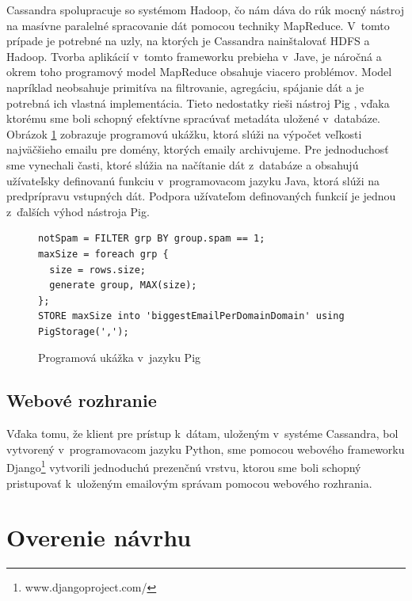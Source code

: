 \documentclass[11pt,twoside,a4paper]{book}
\begin{document}
Cassandra spolupracuje so systémom Hadoop, čo nám dáva do rúk mocný nástroj na masívne paralelné spracovanie dát pomocou techniky MapReduce. V~tomto prípade je potrebné na uzly, na ktorých je Cassandra nainštalovať HDFS a Hadoop. Tvorba aplikácií v~tomto frameworku prebieha v~Jave, je náročná a okrem toho programový model MapReduce obsahuje viacero problémov. Model napríklad neobsahuje primitíva na filtrovanie, agregáciu, spájanie dát a je potrebná ich vlastná implementácia. Tieto nedostatky rieši nástroj Pig \cite{olston2008pig}, vďaka ktorému sme boli schopný efektívne spracúvať metadáta uložené v~databáze. Obrázok \ref{fig:PigExample} zobrazuje programovú ukážku, ktorá slúži na výpočet veľkosti najväčšieho emailu pre domény, ktorých emaily archivujeme. Pre jednoduchosť sme vynechali časti, ktoré slúžia na načítanie dát z~databáze a obsahujú užívateľsky definovanú funkciu v~programovacom jazyku Java, ktorá slúži na predprípravu vstupných dát. Podpora užívateľom definovaných funkcií je jednou z~ďalších výhod nástroja Pig.

\begin{figure}[h]
\begin{verbatim}
notSpam = FILTER grp BY group.spam == 1;
maxSize = foreach grp {
  size = rows.size;
  generate group, MAX(size);
};
STORE maxSize into 'biggestEmailPerDomainDomain' using PigStorage(',');
\end{verbatim}
 \caption{Programová ukážka v~jazyku Pig}
 \label{fig:PigExample}
\end{figure}  



\subsection{Webové rozhranie}
Vďaka tomu, že klient pre prístup k~dátam, uloženým v~systéme Cassandra, bol vytvorený v~programovacom jazyku Python, sme pomocou webového frameworku Django\footnote{www.djangoproject.com/} vytvorili jednoduchú prezenčnú vrstvu, ktorou sme boli schopný pristupovať k~uloženým emailovým správam pomocou webového rozhrania.


\section{Overenie návrhu}
\end{document}
